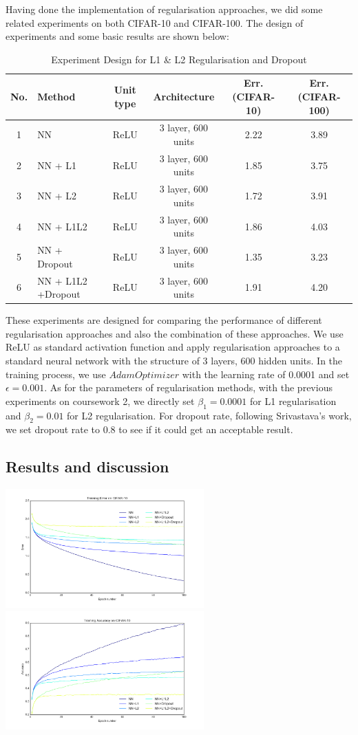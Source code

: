 \documentclass[]{article}
\begin{document}
Having done the implementation of regularisation approaches, we did some related experiments on both CIFAR-10 and CIFAR-100. The design of experiments and some basic results are shown below:
\begin{table}[!ht]
\centering 
\caption{Experiment Design for L1 \& L2 Regularisation and Dropout}
\begin{tabular}{c l c c c c }
\toprule
No. & Method & Unit type & Architecture & Err.(CIFAR-10) & Err.(CIFAR-100)  \\
\midrule
1 & NN & ReLU & 3 layer, 600 units & 2.22 & 3.89 \\
2 & NN + L1 & ReLU & 3 layer, 600 units & 1.85 & 3.75   \\
3 & NN + L2 & ReLU & 3 layer, 600 units & 1.72 & 3.91   \\
4 & NN + L1L2 & ReLU & 3 layer, 600 units & 1.86 & 4.03   \\
5 & NN + Dropout & ReLU & 3 layer, 600 units & 1.35 & 3.23   \\
6 & NN + L1L2 +Dropout & ReLU & 3 layer, 600 units & 1.91 & 4.20   \\
\bottomrule
\end{tabular}
\end{table}

These experiments are designed for comparing the performance of different regularisation approaches and also the combination of these approaches. We use ReLU as standard activation function and apply regularisation approaches to a standard neural network with the structure of 3 layers, 600 hidden units. In the training process, we use $AdamOptimizer$ with the learning rate of 0.0001 and set $\epsilon = 0.001$. As for the parameters of regularisation methods, with the previous experiments on coursework 2, we directly set $\beta_1 = 0.0001$ for L1 regularisation and $\beta_2 = 0.01$ for L2 regularisation. For dropout rate, following Srivastava's work, we set dropout rate to 0.8 to see if it could get an acceptable result.

\subsection{Results and discussion}

\includegraphics[width=3in]{Regularisation_train_err_2}
\includegraphics[width=3in]{Regularisation_train_acc_2}
\end{document}
